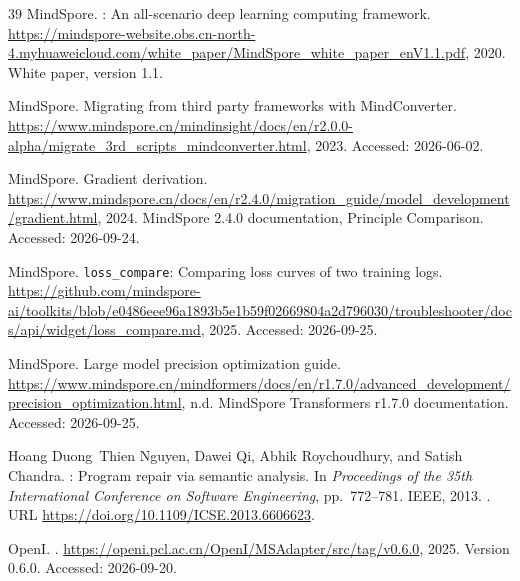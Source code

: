 \documentclass{article}
\begin{document}
\begin{thebibliography}{39}
{MindSpore}.
: An all-scenario deep learning computing framework.
\newblock
  \url{https://mindspore-website.obs.cn-north-4.myhuaweicloud.com/white_paper/MindSpore_white_paper_enV1.1.pdf},
  2020.
\newblock White paper, version 1.1.

{MindSpore}.
\newblock Migrating from third party frameworks with {MindConverter}.
\newblock
  \url{https://www.mindspore.cn/mindinsight/docs/en/r2.0.0-alpha/migrate_3rd_scripts_mindconverter.html},
  2023.
\newblock Accessed: 2026-06-02.

{MindSpore}.
\newblock Gradient derivation.
\newblock
  \url{https://www.mindspore.cn/docs/en/r2.4.0/migration_guide/model_development/gradient.html},
  2024.
\newblock MindSpore 2.4.0 documentation, Principle Comparison. Accessed:
  2026-09-24.

{MindSpore}.
 \texttt{loss\_compare}: Comparing loss curves of two
  training logs.
\newblock
  \url{https://github.com/mindspore-ai/toolkits/blob/e0486eee96a1893b5e1b59f02669804a2d796030/troubleshooter/docs/api/widget/loss_compare.md},
  2025.
\newblock Accessed: 2026-09-25.

{MindSpore}.
\newblock Large model precision optimization guide.
\newblock
  \url{https://www.mindspore.cn/mindformers/docs/en/r1.7.0/advanced_development/precision_optimization.html},
  n.d.
\newblock MindSpore Transformers r1.7.0 documentation. Accessed: 2026-09-25.

Hoang Duong~Thien Nguyen, Dawei Qi, Abhik Roychoudhury, and Satish Chandra.
: Program repair via semantic analysis.
\newblock In \emph{Proceedings of the 35th International Conference on Software
  Engineering}, pp.\  772--781. IEEE, 2013.
\newblock {}.
\newblock URL \url{https://doi.org/10.1109/ICSE.2013.6606623}.

{OpenI}.
.
\newblock \url{https://openi.pcl.ac.cn/OpenI/MSAdapter/src/tag/v0.6.0}, 2025.
\newblock Version 0.6.0. Accessed: 2026-09-20.


\end{thebibliography}
\end{document}
